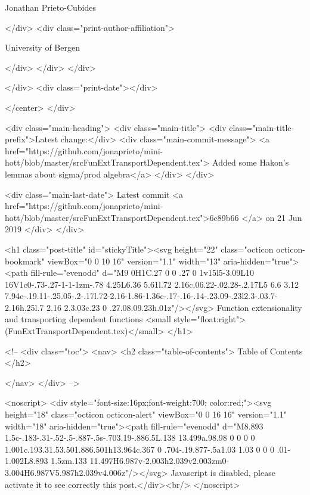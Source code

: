                   Jonathan Prieto-Cubides
                
              </div>
              <div class="print-author-affiliation">
                
                  University of Bergen
                
                </div>
            </div>
          </div>
          
          
        </div>
        <div class="print-date"></div>
        
        
    </center>
  </div>

  
  <div class="main-heading">
    <div class="main-title">
      <div class="main-title-prefix">Latest change:</div>
      <div class="main-commit-message">
            <a href="https://github.com/jonaprieto/mini-hott/blob/master/srcFunExtTransportDependent.tex">
              Added some Hakon's lemmas about sigma/prod algebra</a>
      </div>
    </div>

    <div class="main-last-date">
      Latest commit <a href="https://github.com/jonaprieto/mini-hott/blob/master/srcFunExtTransportDependent.tex">6c89b66 </a> on  21 Jun 2019
    </div>
  </div>
  

  <h1 class="post-title" id="stickyTitle"><svg height="22" class="octicon octicon-bookmark" viewBox="0 0 10 16" version="1.1" width="13" aria-hidden="true"><path fill-rule="evenodd" d="M9 0H1C.27 0 0 .27 0 1v15l5-3.09L10 16V1c0-.73-.27-1-1-1zm-.78 4.25L6.36 5.61l.72 2.16c.06.22-.02.28-.2.17L5 6.6 3.12 7.94c-.19.11-.25.05-.2-.17l.72-2.16-1.86-1.36c-.17-.16-.14-.23.09-.23l2.3-.03.7-2.16h.25l.7 2.16 2.3.03c.23 0 .27.08.09.23h.01z"/></svg> Function extensionality and transporting dependent functions  <small style="float:right">(FunExtTransportDependent.tex)</small>
  </h1>

  <!-- 
  <div class="toc">
    <nav>
    <h2 class="table-of-contents"> Table of Contents </h2>
      

    </nav>
  </div>
   -->

  <noscript>
  <div style="font-size:16px;font-weight:700; color:red;"><svg height="18" class="octicon octicon-alert" viewBox="0 0 16 16" version="1.1" width="18" aria-hidden="true"><path fill-rule="evenodd" d="M8.893 1.5c-.183-.31-.52-.5-.887-.5s-.703.19-.886.5L.138 13.499a.98.98 0 0 0 0 1.001c.193.31.53.501.886.501h13.964c.367 0 .704-.19.877-.5a1.03 1.03 0 0 0 .01-1.002L8.893 1.5zm.133 11.497H6.987v-2.003h2.039v2.003zm0-3.004H6.987V5.987h2.039v4.006z"/></svg> Javascript is disabled, please activate it to see correctly this post.</div><br/>
  </noscript>

